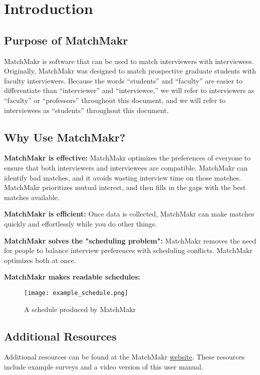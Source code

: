 

\chapter{Introduction}

\section{Purpose of MatchMakr}
MatchMakr is software that can be used to match interviewers with interviewees.  Originally, MatchMakr was designed to match prospective graduate students with faculty interviewers.  Because the words ``students'' and ``faculty'' are easier to differentiate than ``interviewer'' and ``interviewee,'' we will refer to interviewers as ``faculty'' or ``professors'' throughout this document, and we will refer to interviewees as ``students'' throughout this document.

\section{Why Use MatchMakr?}
\par
\textbf{MatchMakr is effective:} 
MatchMakr optimizes the preferences of everyone to ensure that both interviewers and interviewees are compatible.  MatchMakr can identify bad matches, and it avoids wasting interview time on those matches.  MatchMakr prioritizes mutual interest, and then fills in the gaps with the best matches available.

\par
\textbf{MatchMakr is efficient:}
Once data is collected, MatchMakr can make matches quickly and effortlessly while you do other things.

\par
\textbf{MatchMakr solves the "scheduling problem":}
MatchMakr removes the need for people to balance interview preferences with scheduling conflicts.  MatchMakr optimizes both at once.


\textbf{MatchMakr makes readable schedules:}
\begin{figure}[!h]
	\centering
	\texttt{[image: example\_schedule.png]}
	\caption{\label{fig:example_schedule} A schedule produced by MatchMakr}
\end{figure}

\section{Additional Resources}
Additional resources can be found at the MatchMakr \href{\website}{website}.  These resources include example surveys and a video version of this user manual.